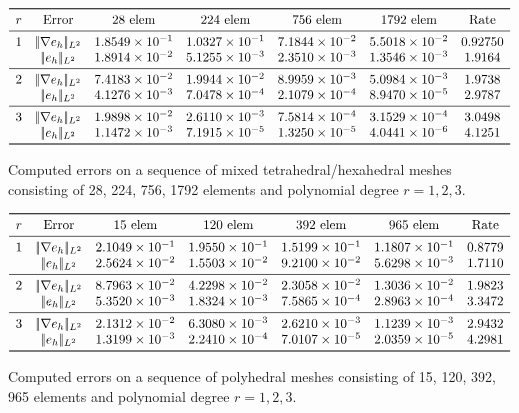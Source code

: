 \documentclass[12pt, a4paper]{article}
\theoremstyle{definition}
\theoremstyle{plain}
\theoremstyle{plain}
\theoremstyle{definition}
\begin{document}
\begin{table}[h]\footnotesize
	\centering
	\[
	\begin{array}{ccccccc}
	\toprule
	r & \text{Error} & \text{28 elem} & \text{224 elem} & \text{756 elem} & \text{1792 elem} & \text{Rate} \\ 
	\midrule
	1 & |\!|\nabla e_{h}|\!|_{L^2} & 1.8549 \times 10^{-1} & 1.0327 \times 10^{-1} & 7.1844 \times 10^{-2} & 5.5018 \times 10^{-2} & 0.92750\\
	& |\!|e_{h}|\!|_{L^2} & 1.8914 \times 10^{-2} & 5.1255 \times 10^{-3} & 2.3510 \times 10^{-3} & 1.3546 \times 10^{-3} & 1.9164\\
	\midrule
	2 & |\!|\nabla e_{h}|\!|_{L^2} & 7.4183 \times 10^{-2} & 1.9944 \times 10^{-2} & 8.9959 \times 10^{-3} & 5.0984 \times 10^{-3} & 1.9738\\
	& |\!|e_{h}|\!|_{L^2} & 4.1276 \times 10^{-3} & 7.0478 \times 10^{-4} & 2.1079 \times 10^{-4} & 8.9470 \times 10^{-5} & 2.9787\\
	\midrule
	3 & |\!|\nabla e_{h}|\!|_{L^2} & 1.9898 \times 10^{-2} & 2.6110 \times 10^{-3} & 7.5814 \times 10^{-4} & 3.1529 \times 10^{-4} & 3.0498\\
	& |\!|e_{h}|\!|_{L^2} & 1.1472 \times 10^{-3} & 7.1915 \times 10^{-5} & 1.3250 \times 10^{-5} & 4.0441 \times 10^{-6} & 4.1251\\
	\bottomrule
	\end{array}
	\]
	\caption{Computed errors on a sequence of mixed tetrahedral/hexahedral 
	meshes consisting of 28, 224, 756, 1792 elements and polynomial degree 
	$r=1,2,3$.} \label{tab:hhextet}
\end{table}
\begin{table}[h]\footnotesize
	\centering
	\[
	\begin{array}{ccccccc}
	\toprule
	r & \text{Error} & \text{15 elem} & \text{120 elem} & \text{392 elem} & \text{965 elem} & \text{Rate} \\ 
	\midrule
	1 & |\!|\nabla e_{h}|\!|_{L^2} & 2.1049 \times 10^{-1} & 1.9550 \times 10^{-1} & 1.5199 \times 10^{-1} & 1.1807 \times 10^{-1} & 0.8779\\
	& |\!|e_{h}|\!|_{L^2} & 2.5624 \times 10^{-2} & 1.5503 \times 10^{-2} & 9.2100 \times 10^{-2} & 5.6298 \times 10^{-3} & 1.7110\\
	\midrule
	2 & |\!|\nabla e_{h}|\!|_{L^2} & 8.7963 \times 10^{-2} & 4.2298 \times 10^{-2} & 2.3058 \times 10^{-2} & 1.3036 \times 10^{-2} & 1.9823\\
	& |\!|e_{h}|\!|_{L^2} & 5.3520 \times 10^{-3} & 1.8324 \times 10^{-3} & 7.5865 \times 10^{-4} & 2.8963 \times 10^{-4} & 3.3472\\
	\midrule
	3 & |\!|\nabla e_{h}|\!|_{L^2} & 2.1312 \times 10^{-2} & 6.3080 \times 10^{-3} & 2.6210 \times 10^{-3} & 1.1239 \times 10^{-3} & 2.9432\\
	& |\!|e_{h}|\!|_{L^2} & 1.3199 \times 10^{-3} & 2.2410 \times 10^{-4} & 7.0107 \times 10^{-5} & 2.0359 \times 10^{-5} & 4.2981\\
	\bottomrule
	\end{array}
	\]
	\caption{Computed errors on a sequence of polyhedral meshes consisting of 
	15, 120, 392, 965 elements and polynomial degree $r=1,2,3$.} \label{tab:hpol}
\end{table}
\end{document}
